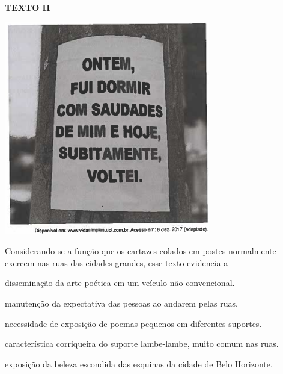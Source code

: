 \noindent
\textbf{TEXTO II}
\par\noindent
\includegraphics[width=\columnwidth]{subareas/linguagens/image1.png}

Considerando-se a função que os cartazes colados em postes normalmente exercem nas ruas das cidades grandes, esse texto evidencia a
\begin{alternativas}
  \item disseminação da arte poética em um veículo não convencional.
  \item manutenção da expectativa das pessoas ao andarem pelas ruas.
  \item necessidade de exposição de poemas pequenos em diferentes suportes.
  \item característica corriqueira do suporte lambe-lambe, muito comum nas ruas.
  \item exposição da beleza escondida das esquinas da cidade de Belo Horizonte.
\end{alternativas}

\label{last-linguagens}

